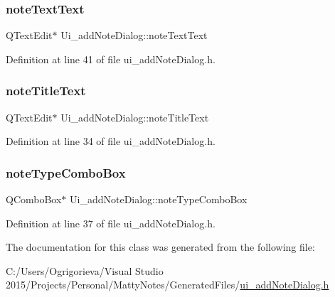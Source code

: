 \subsubsection{\texorpdfstring{note\+Text\+Text}{noteTextText}}
{\footnotesize\ttfamily Q\+Text\+Edit$\ast$ Ui\+\_\+add\+Note\+Dialog\+::note\+Text\+Text}



Definition at line 41 of file ui\+\_\+add\+Note\+Dialog.\+h.

\hypertarget{classUi__addNoteDialog_ab6a4a2b756400a734bf7f4d786aa8d20}{}\label{classUi__addNoteDialog_ab6a4a2b756400a734bf7f4d786aa8d20} 
\subsubsection{\texorpdfstring{note\+Title\+Text}{noteTitleText}}
{\footnotesize\ttfamily Q\+Text\+Edit$\ast$ Ui\+\_\+add\+Note\+Dialog\+::note\+Title\+Text}



Definition at line 34 of file ui\+\_\+add\+Note\+Dialog.\+h.

\hypertarget{classUi__addNoteDialog_acf0ac47d3c4f567ca69a17769d35409d}{}\label{classUi__addNoteDialog_acf0ac47d3c4f567ca69a17769d35409d} 
\subsubsection{\texorpdfstring{note\+Type\+Combo\+Box}{noteTypeComboBox}}
{\footnotesize\ttfamily Q\+Combo\+Box$\ast$ Ui\+\_\+add\+Note\+Dialog\+::note\+Type\+Combo\+Box}



Definition at line 37 of file ui\+\_\+add\+Note\+Dialog.\+h.



The documentation for this class was generated from the following file\+:\begin{DoxyCompactItemize}
\item 
C\+:/\+Users/\+Ogrigorieva/\+Visual Studio 2015/\+Projects/\+Personal/\+Matty\+Notes/\+Generated\+Files/\hyperlink{ui__addNoteDialog_8h}{ui\+\_\+add\+Note\+Dialog.\+h}\end{DoxyCompactItemize}
